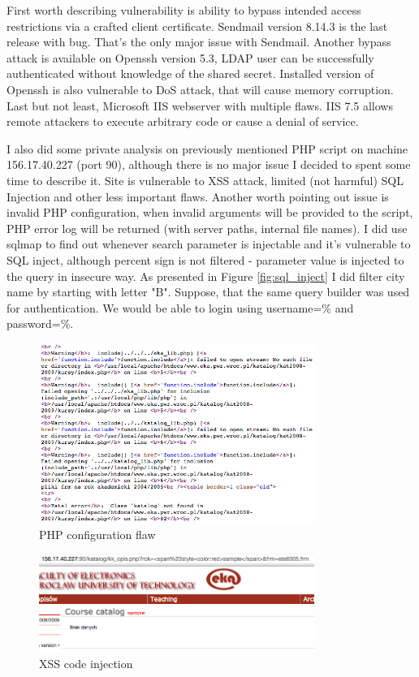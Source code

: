 \documentclass[a4paper, 11pt]{article}
\begin{document}
First worth describing vulnerability is ability to bypass intended access restrictions via a crafted client certificate. Sendmail version 8.14.3 is the last release with bug. That's the only major issue with Sendmail. Another bypass attack is available on Openssh version 5.3, LDAP user can be successfully authenticated without knowledge of the shared secret. Installed version of Openssh is also vulnerable to DoS attack, that  will cause memory corruption.
Last but not least, Microsoft IIS webserver with multiple flaws. IIS 7.5 allows remote attackers to execute arbitrary code or cause a denial of service.

I also did some private analysis on previously mentioned PHP script on machine 156.17.40.227 (port 90), although there is no major issue I decided to spent some time to describe it. Site is vulnerable to XSS attack, limited (not harmful) SQL Injection and other less important flaws. Another worth pointing out issue is invalid PHP configuration, when invalid arguments will be provided to the script, PHP error log will be returned (with server paths, internal file names). I did use sqlmap to find out whenever search parameter is injectable and it's vulnerable to SQL inject, although percent sign is not filtered - parameter value is injected to the query in insecure way. As presented in Figure \ref{fig:sql_inject} I did filter city name by starting with letter "B". Suppose, that the same query builder was used for authentication. We would be able to login using username=\% and password=\%.


\begin{figure}[!htb]
  \centering
      \includegraphics[width=0.8\textwidth]{apache/php_error}
  \caption{PHP configuration flaw}
  \label{fig:php_error}    
\end{figure}

\begin{figure}[!htb]
  \centering
      \includegraphics[width=0.8\textwidth]{apache/XSS_injection}
  \caption{XSS code injection}
  \label{fig:xss_inject}    
\end{figure}
\end{document}
